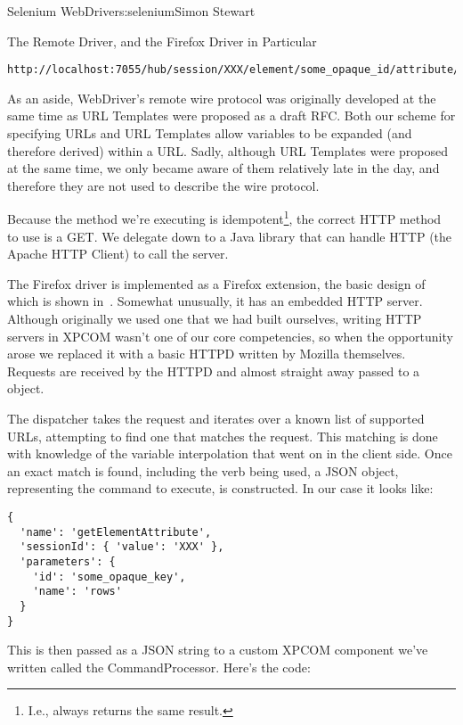 \begin{aosachapter}{Selenium WebDriver}{s:selenium}{Simon Stewart}
\begin{aosasect1}{The Remote Driver, and the Firefox Driver in Particular}
\begin{verbatim}
http://localhost:7055/hub/session/XXX/element/some_opaque_id/attribute/row
\end{verbatim}

As an aside, WebDriver's remote wire protocol was originally developed
at the same time as URL Templates were proposed as a draft RFC\@. Both
our scheme for specifying URLs and URL Templates allow variables to be
expanded (and therefore derived) within a URL\@. Sadly, although URL
Templates were proposed at the same time, we only became aware of them
relatively late in the day, and therefore they are not used to
describe the wire protocol.

Because the method we're executing is idempotent\footnote{I.e., always
returns the same result.}, the correct HTTP method to use is a
GET\@. We delegate down to a Java library that can handle HTTP (the
Apache HTTP Client) to call the server.


The Firefox driver is implemented as a Firefox extension, the basic
design of which is shown in~.
Somewhat unusually, it has an embedded HTTP server.  Although
originally we used one that we had built ourselves, writing HTTP
servers in XPCOM wasn't one of our core competencies, so when the
opportunity arose we replaced it with a basic HTTPD written by Mozilla
themselves.  Requests are received by the HTTPD and almost straight
away passed to a  object.

The dispatcher takes the request and iterates over a known list of
supported URLs, attempting to find one that matches the request. This
matching is done with knowledge of the variable interpolation that
went on in the client side. Once an exact match is found, including
the verb being used, a JSON object, representing the command to
execute, is constructed. In our case it looks like:

\begin{verbatim}
{
  'name': 'getElementAttribute',
  'sessionId': { 'value': 'XXX' },
  'parameters': {
    'id': 'some_opaque_key',
    'name': 'rows'
  }
}
\end{verbatim}

\noindent This is then passed as a JSON string to a custom XPCOM component we've
written called the CommandProcessor. Here's the code:


\end{aosasect1}
\end{aosachapter}
